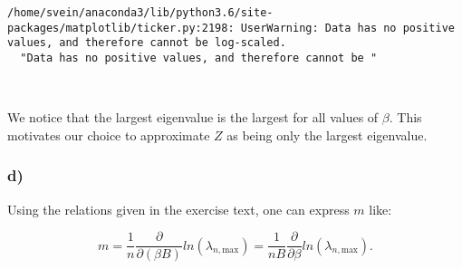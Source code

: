 \documentclass[11pt]{article}
\begin{document}
    \begin{Verbatim}[commandchars=\\\{\}]
/home/svein/anaconda3/lib/python3.6/site-packages/matplotlib/ticker.py:2198: UserWarning: Data has no positive values, and therefore cannot be log-scaled.
  "Data has no positive values, and therefore cannot be "

    \end{Verbatim}

    \begin{center}
    \end{center}
    { \hspace*{\fill} \\}
    
    We notice that the largest eigenvalue is the largest for all values of
\(\beta\). This motivates our choice to approximate \(Z\) as being only
the largest eigenvalue.

    \subsubsection{d)}\label{d}

Using the relations given in the exercise text, one can express \(m\)
like:

\begin{equation}
    m = \frac{1}{n}\frac{\partial}{\partial (\beta B)} ln(\lambda_{n, \text{max}}) = \frac{1}{nB}\frac{\partial}{\partial \beta} ln(\lambda_{n, \text{max}}).
\end{equation}
\end{document}
